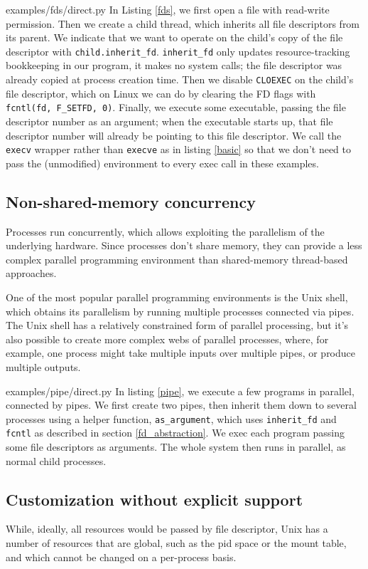 \documentclass[sigplan]{acmart}
\begin{document}

{examples/fds/direct.py}
In Listing \ref{fds},
we first open a file with read-write permission.
Then we create a child thread,
which inherits all file descriptors from its parent.
We indicate that we want to operate on the child's copy of the file descriptor with \verb|child.inherit_fd|.
\verb|inherit_fd| only updates resource-tracking bookkeeping in our program,
it makes no system calls;
the file descriptor was already copied at process creation time.
Then we disable \texttt{CLOEXEC} on the child's file descriptor,
which on Linux we can do by clearing the FD flags with \verb|fcntl(fd, F_SETFD, 0)|.
Finally, we execute some executable,
passing the file descriptor number as an argument;
when the executable starts up, that file descriptor number will already be pointing to this file descriptor.
We call the \texttt{execv} wrapper rather than \texttt{execve} as in listing \ref{basic}
so that we don't need to pass the (unmodified) environment to every exec call in these examples.
\subsection{Non-shared-memory concurrency}
Processes run concurrently,
which allows exploiting the parallelism of the underlying hardware.
Since processes don't share memory,
they can provide a less complex parallel programming environment
than shared-memory thread-based approaches.

One of the most popular parallel programming environments is the Unix shell,
which obtains its parallelism by running multiple processes connected via pipes.
The Unix shell has a relatively constrained form of parallel processing,
but it's also possible to create more complex webs of parallel processes,
where, for example, one process might take multiple inputs over multiple pipes,
or produce multiple outputs.


{examples/pipe/direct.py}
In listing \ref{pipe},
we execute a few programs in parallel,
connected by pipes.
We first create two pipes,
then inherit them down to several processes using a helper function, \verb|as_argument|,
which uses \verb|inherit_fd| and \texttt{fcntl} as described in section \ref{fd_abstraction}.
We exec each program passing some file descriptors as arguments.
The whole system then runs in parallel,
as normal child processes.
\subsection{Customization without explicit support}
While, ideally, all resources would be passed by file descriptor,\cite{capsicum}
Unix has a number of resources that are global,
such as the pid space or the mount table,
and which cannot be changed on a per-process basis.
\end{document}
